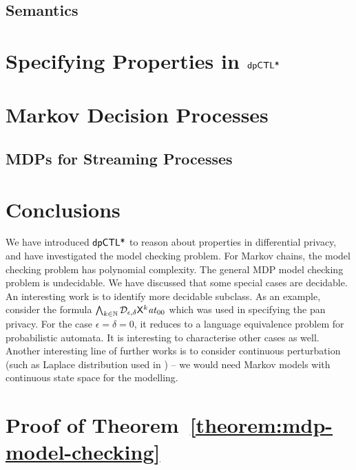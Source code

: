 \documentclass{llncs}
\begin{document}
\subsection{Semantics}
\label{subsection:semantics}


\section{Specifying Properties in $\textsf{dpCTL*}$}
\label{section:specifying-properties}


\section{Markov Decision Processes}
\label{section:mdp}


%


\subsection{MDPs for Streaming Processes}
\label{section:applications}


\section{Conclusions}
\label{section:conclusions}
We have introduced $\textsf{dpCTL*}$ to reason about properties in differential privacy, and have investigated the model checking problem. For Markov chains, the model checking problem has polynomial complexity. The general MDP model checking problem is undecidable. We have discussed that some special cases are decidable. An interesting work is to identify more
decidable subclass. As an example, consider the formula $\bigwedge_{k \in \mathbb{N}}
\mathcal{D}_{{\epsilon}, {\delta}} \mathsf{X}^k \mathit{at}_{00}$ which was used in specifying the pan privacy. For the case $\epsilon=\delta=0$, it reduces to a language equivalence problem for probabilistic automata. It is interesting to characterise other cases as well.
 Another interesting line of further works is to consider continuous perturbation (such as Laplace distribution used in \cite{DR:14:AFDP}) -- we would need Markov models with continuous state space for the modelling.





\newpage
\appendix

\section{Proof of Theorem~\ref{theorem:mdp-model-checking}}

\end{document}
